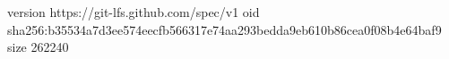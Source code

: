 version https://git-lfs.github.com/spec/v1
oid sha256:b35534a7d3ee574eecfb566317e74aa293bedda9eb610b86cea0f08b4e64baf9
size 262240
